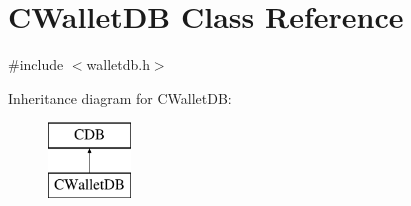 \hypertarget{class_c_wallet_d_b}{}\section{C\+Wallet\+DB Class Reference}
\label{class_c_wallet_d_b}


{\ttfamily \#include $<$walletdb.\+h$>$}

Inheritance diagram for C\+Wallet\+DB\+:\begin{figure}[H]
\begin{center}
\leavevmode
\includegraphics[height=2.000000cm]{class_c_wallet_d_b}
\end{center}
\end{figure}
